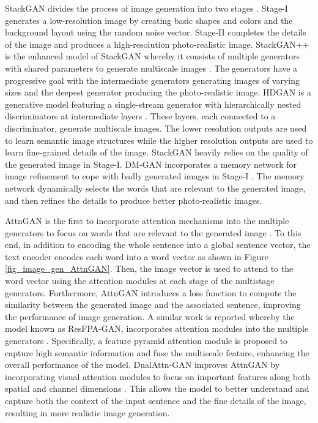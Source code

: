 \documentclass[preprint,12pt]{elsarticle}
\begin{document}
StackGAN divides the process of image generation into two stages \citep{zhang_stackgan_2017}. Stage-I generates a low-resolution image by creating basic shapes and colors and the background layout using the random noise vector. Stage-II completes the details of the image and produces a high-resolution photo-realistic image. StackGAN++ is the enhanced model of StackGAN whereby it consists of multiple generators with shared parameters to generate multiscale images \citep{zhang_stackgan_2018}. The generators have a progressive goal with the intermediate generators generating images of varying sizes and the deepest generator producing the photo-realistic image. HDGAN is a generative model featuring a single-stream generator with hierarchically nested discriminators at intermediate layers \citep{zhang_photographic_2018}. These layers, each connected to a discriminator, generate multiscale images. The lower resolution outputs are used to learn semantic image structures while the higher resolution outputs are used to learn fine-grained details of the image. StackGAN heavily relies on the quality of the generated image in Stage-I. DM-GAN incorporates a memory network for image refinement to cope with badly generated images in Stage-I \citep{zhu_dm-gan_2019}. The memory network dynamically selects the words that are relevant to the generated image, and then refines the details to produce better photo-realistic images.

AttnGAN is the first to incorporate attention mechanisms into the multiple generators to focus on words that are relevant to the generated image \citep{xu_attngan_2018}. To this end, in addition to encoding the whole sentence into a global sentence vector, the text encoder encodes each word into a word vector as shown in Figure \ref{fig_image_gen_AttnGAN}. Then, the image vector is used to attend to the word vector using the attention modules at each stage of the multistage generators. Furthermore, AttnGAN introduces a loss function to compute the similarity between the generated image and the associated sentence, improving the performance of image generation. A similar work is reported whereby the model known as ResFPA-GAN, incorporates attention modules into the multiple generators \citep{sun_resfpa-gan_2019}. Specifically, a feature pyramid attention module is proposed to capture high semantic information and fuse the multiscale feature, enhancing the overall performance of the model. DualAttn-GAN improves AttnGAN by incorporating visual attention modules to focus on important features along both spatial and channel dimensions \citep{cai_dualattn-gan_2019}. This allows the model to better understand and capture both the context of the input sentence and the fine details of the image, resulting in more realistic image generation.
\end{document}
